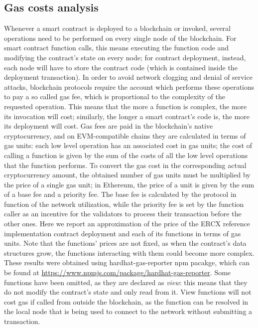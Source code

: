\documentclass[english, LaM, oneside]{sapthesis}%
\begin{document}
\subsection{Gas costs analysis}
Whenever a smart contract is deployed to a blockchain or invoked, several operations need to be performed on every single node of the blockchain. For smart contract function calls, this means executing the function code and modifying the contract's state on every node; for contract deployment, instead, each node will have to store the contract code (which is contained inside the deployment transaction). In order to avoid network clogging and denial of service attacks, blockchain protocols require the account which performs these operations to pay a so called gas fee, which is proportional to the complexity of the requested operation. This means that the more a function is complex, the more its invocation will cost; similarly, the longer a smart contract's code is, the more its deployment will cost.\newline
Gas fees are paid in the blockchain's native cryptocurrency, and on EVM-compatible chains they are calculated in terms of gas units: each low level operation has an associated cost in gas units; the cost of calling a function is given by the sum of the costs of all the low level operations that the function performs. To convert the gas cost in the corresponding actual cryptocurrency amount, the obtained number of gas units must be multiplied by the price of a single gas unit; in Ethereum, the price of a unit is given by the sum of a base fee and a priority fee. The base fee is calculated by the protocol in function of the network utilization, while the priority fee is set by the function caller as an incentive for the validators to process their transaction before the other ones.\newline
Here we report an approximation of the price of the ERCX reference implementation contract deployment and each of its functions in terms of gas units. Note that the functions' prices are not fixed, as when the contract's data structures grow, the functions interacting with them could become more complex. These results were obtained using hardhat-gas-reporter npm pacakge, which can be found at \url{https://www.npmjs.com/package/hardhat-gas-reporter}. Some functions have been omitted, as they are declared as \textit{view}: this means that they do not modify the contract's state and only read from it. View functions will not cost gas if called from outside the blockchain, as the function can be resolved in the local node that is being used to connect to the network without submitting a transaction.
\end{document}
